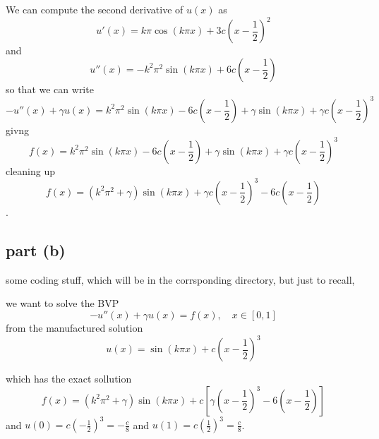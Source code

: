 \documentclass[12pt]{article}
\begin{document}
We can compute the second derivative of $u(x)$ as
\begin{equation}
    u'(x) = k \pi \cos(k \pi x) + 3c (x - \frac{1}{2})^2
\end{equation}
and
\begin{equation}
    u''(x) = -k^2 \pi^2 \sin(k \pi x) + 6c (x - \frac{1}{2})
\end{equation}
so that we can write
\begin{equation}
    -u''(x) + \gamma u(x) = k^2 \pi^2 \sin(k \pi x) - 6c (x - \frac{1}{2}) + \gamma \sin(k \pi x) + \gamma c (x - \frac{1}{2})^3
\end{equation}
givng 
\begin{equation}
    f(x) = k^2 \pi^2 \sin(k \pi x) - 6c (x - \frac{1}{2}) + \gamma \sin(k \pi x) + \gamma c (x - \frac{1}{2})^3
\end{equation}
cleaning up 
\begin{equation}
    f(x) = (k^2 \pi^2 + \gamma) \sin(k \pi x) + \gamma c (x - \frac{1}{2})^3 - 6c (x - \frac{1}{2})
\end{equation}.

\subsection{part (b)}

some coding stuff, which  will be in the corrsponding directory, but just to recall, 

we want to solve the BVP
\begin{equation}
    -u''(x) + \gamma u(x) = f(x), \quad x \in [0, 1]
\end{equation}
from the manufactured solution 
\begin{equation}
    u(x) = \sin(k \pi x) + c (x - \frac{1}{2})^3
\end{equation}

which has the exact sollution 
\begin{equation}
    f(x) = (k^2 \pi^2 + \gamma) \sin(k \pi x) + c [\gamma (x - \frac{1}{2})^3 - 6 (x - \frac{1}{2})]
\end{equation}
and $u(0) = c \left(-\frac{1}{2}\right)^3 = -\frac{c}{8}$ and $u(1) = c \left(\frac{1}{2}\right)^3 = \frac{c}{8}$.
\end{document}
